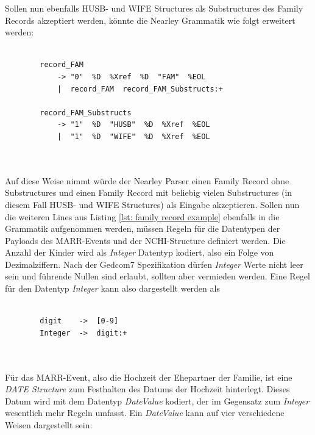Sollen nun ebenfalls HUSB- und WIFE Structures als Substructures des Family Records akzeptiert werden, könnte die Nearley Grammatik wie folgt erweitert werden:
\\ \\
\begin{minipage}{1.0\textwidth} \small
	\begin{lstlisting}
		record_FAM
			-> "0"  %D  %Xref  %D  "FAM"  %EOL 
			|  record_FAM  record_FAM_Substructs:+
		
		record_FAM_Substructs 
			-> "1"  %D  "HUSB"  %D  %Xref  %EOL
			|  "1"  %D  "WIFE"  %D  %Xref  %EOL 
	\end{lstlisting}
	\label{lst: nearley regel family record with husb and wife}
\end{minipage}
\\ \\
Auf diese Weise nimmt würde der Nearley Parser einen Family Record ohne Substructures und einen Family Record mit beliebig vielen Substructures (in diesem Fall HUSB- und WIFE Structures) als Eingabe akzeptieren. Sollen nun die weiteren Lines aus Listing \ref{lst: family record example} ebenfalls in die Grammatik aufgenommen werden, müssen Regeln für die Datentypen der Payloads des MARR-Events und der NCHI-Structure definiert werden. Die Anzahl der Kinder wird als  \textit{Integer} Datentyp kodiert, also ein Folge von Dezimalziffern. Nach der Gedcom7 Spezifikation dürfen \textit{Integer} Werte nicht leer sein und führende Nullen sind erlaubt, sollten aber vermieden werden. Eine Regel für den Datentyp \textit{Integer} kann also dargestellt werden als
\\ \\
\begin{minipage}{1.0\textwidth} \small
	\begin{lstlisting}
		digit    ->  [0-9]
		Integer  ->  digit:+
	\end{lstlisting}
	\label{lst: nearley regel integer}
\end{minipage}
\\ \\ 
Für das MARR-Event, also die Hochzeit der Ehepartner der Familie, ist eine \textit{DATE Structure} zum Festhalten des Datums der Hochzeit hinterlegt. Dieses Datum wird mit dem Datentyp \textit{DateValue} kodiert, der im Gegensatz zum \textit{Integer} wesentlich mehr Regeln umfasst. Ein \textit{DateValue} kann auf vier verschiedene Weisen dargestellt sein:
